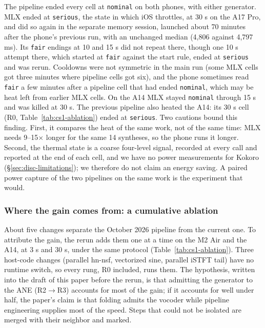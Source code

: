 \documentclass[11pt]{article}
\newcommand{\code}[1]{\texttt{#1}}
\begin{document}
The pipeline ended every cell at \code{nominal} on both phones, with either generator. MLX ended at \code{serious}, the state in which iOS throttles, at 30 s on the A17 Pro, and did so again in the separate memory session, launched about 70 minutes after the phone's previous run, with an unchanged median (4,806 against 4,797 ms). Its \code{fair} endings at 10 and 15 s did not repeat there, though one 10 s attempt there, which started at \code{fair} against the start rule, ended at \code{serious} and was rerun. Cooldowns were not symmetric in the main run (some MLX cells got three minutes where pipeline cells got six), and the phone sometimes read \code{fair} a few minutes after a pipeline cell that had ended \code{nominal}, which may be heat left from earlier MLX cells. On the A14 MLX stayed \code{nominal} through 15 s and was killed at 30 s. The previous pipeline also heated the A14: its 30 s cell (R0, Table~\ref{tab:cs1-ablation}) ended at \code{serious}. Two cautions bound this finding. First, it compares the heat of the same work, not of the same time: MLX needs 9--15$\times$ longer for the same 14 syntheses, so the phone runs it longer. Second, the thermal state is a coarse four-level signal, recorded at every call and reported at the end of each cell, and we have no power measurements for Kokoro (\S\ref{sec:disc-limitations}); we therefore do not claim an energy saving. A paired power capture of the two pipelines on the same work is the experiment that would.

\subsubsection{Where the gain comes from: a cumulative ablation}\label{sec:cs1-ablation}

About five changes separate the October 2026 pipeline from the current one. To attribute the gain, the rerun adds them one at a time on the M2 Air and the A14, at 3 s and 30 s, under the same protocol (Table~\ref{tab:cs1-ablation}). Three host-code changes (parallel hn-nsf, vectorized sine, parallel iSTFT tail) have no runtime switch, so every rung, R0 included, runs them. The hypothesis, written into the draft of this paper before the rerun, is that admitting the generator to the ANE (R2$\rightarrow$R3) accounts for most of the gain; if it accounts for well under half, the paper's claim is that folding admits the vocoder while pipeline engineering supplies most of the speed. Steps that could not be isolated are merged with their neighbor and marked.
\end{document}
